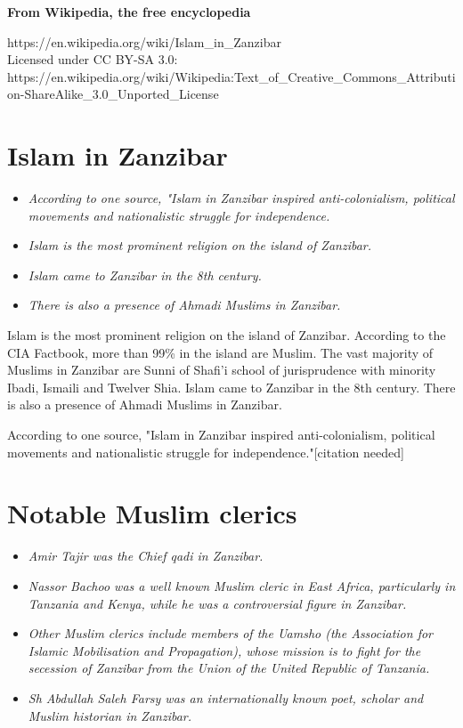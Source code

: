 \textbf{From Wikipedia, the free encyclopedia}

https://en.wikipedia.org/wiki/Islam\_in\_Zanzibar\\
Licensed under CC BY-SA 3.0:\\
https://en.wikipedia.org/wiki/Wikipedia:Text\_of\_Creative\_Commons\_Attribution-ShareAlike\_3.0\_Unported\_License

\section{Islam in Zanzibar}\label{islam-in-zanzibar}

\begin{itemize}
\item
  \emph{According to one source, "Islam in Zanzibar inspired
  anti-colonialism, political movements and nationalistic struggle for
  independence.}
\item
  \emph{Islam is the most prominent religion on the island of Zanzibar.}
\item
  \emph{Islam came to Zanzibar in the 8th century.}
\item
  \emph{There is also a presence of Ahmadi Muslims in Zanzibar.}
\end{itemize}

Islam is the most prominent religion on the island of Zanzibar.
According to the CIA Factbook, more than 99\% in the island are Muslim.
The vast majority of Muslims in Zanzibar are Sunni of Shafi'i school of
jurisprudence with minority Ibadi, Ismaili and Twelver Shia. Islam came
to Zanzibar in the 8th century. There is also a presence of Ahmadi
Muslims in Zanzibar.

According to one source, "Islam in Zanzibar inspired anti-colonialism,
political movements and nationalistic struggle for
independence."{[}citation needed{]}

\section{Notable Muslim clerics}\label{notable-muslim-clerics}

\begin{itemize}
\item
  \emph{Amir Tajir was the Chief qadi in Zanzibar.}
\item
  \emph{Nassor Bachoo was a well known Muslim cleric in East Africa,
  particularly in Tanzania and Kenya, while he was a controversial
  figure in Zanzibar.}
\item
  \emph{Other Muslim clerics include members of the Uamsho (the
  Association for Islamic Mobilisation and Propagation), whose mission
  is to fight for the secession of Zanzibar from the Union of the United
  Republic of Tanzania.}
\item
  \emph{Sh Abdullah Saleh Farsy was an internationally known poet,
  scholar and Muslim historian in Zanzibar.}
\end{itemize}

